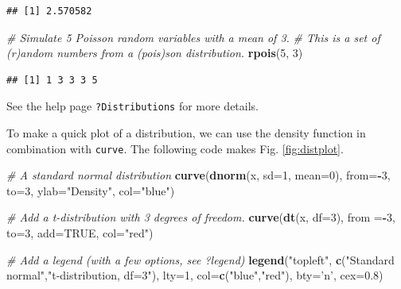 \documentclass[]{book}
\newenvironment{Shaded}{\begin{snugshade}}{\end{snugshade}}
\newcommand{\CommentTok}[1]{\textcolor[rgb]{0.56,0.35,0.01}{\textit{#1}}}
\newcommand{\DataTypeTok}[1]{\textcolor[rgb]{0.13,0.29,0.53}{#1}}
\newcommand{\DecValTok}[1]{\textcolor[rgb]{0.00,0.00,0.81}{#1}}
\newcommand{\FloatTok}[1]{\textcolor[rgb]{0.00,0.00,0.81}{#1}}
\newcommand{\KeywordTok}[1]{\textcolor[rgb]{0.13,0.29,0.53}{\textbf{#1}}}
\newcommand{\NormalTok}[1]{#1}
\newcommand{\OperatorTok}[1]{\textcolor[rgb]{0.81,0.36,0.00}{\textbf{#1}}}
\newcommand{\OtherTok}[1]{\textcolor[rgb]{0.56,0.35,0.01}{#1}}
\newcommand{\StringTok}[1]{\textcolor[rgb]{0.31,0.60,0.02}{#1}}
\begin{document}
\begin{Shaded}
\end{Shaded}

\begin{verbatim}
## [1] 2.570582
\end{verbatim}

\begin{Shaded}
\begin{Highlighting}[]
\CommentTok{# Simulate 5 Poisson random variables with a mean of 3. }
\CommentTok{# This is a set of (r)andom numbers from a (pois)son distribution.}
\KeywordTok{rpois}\NormalTok{(}\DecValTok{5}\NormalTok{, }\DecValTok{3}\NormalTok{)}
\end{Highlighting}
\end{Shaded}

\begin{verbatim}
## [1] 1 3 3 3 5
\end{verbatim}

See the help page \texttt{?Distributions} for more details.

To make a quick plot of a distribution, we can use the density function in combination with \texttt{curve}. The following code makes Fig. \ref{fig:distplot}.

\begin{Shaded}
\begin{Highlighting}[]
\CommentTok{# A standard normal distribution}
\KeywordTok{curve}\NormalTok{(}\KeywordTok{dnorm}\NormalTok{(x, }\DataTypeTok{sd=}\DecValTok{1}\NormalTok{, }\DataTypeTok{mean=}\DecValTok{0}\NormalTok{), }\DataTypeTok{from=}\OperatorTok{-}\DecValTok{3}\NormalTok{, }\DataTypeTok{to=}\DecValTok{3}\NormalTok{,}
      \DataTypeTok{ylab=}\StringTok{"Density"}\NormalTok{, }\DataTypeTok{col=}\StringTok{"blue"}\NormalTok{)}

\CommentTok{# Add a t-distribution with 3 degrees of freedom.}
\KeywordTok{curve}\NormalTok{(}\KeywordTok{dt}\NormalTok{(x, }\DataTypeTok{df=}\DecValTok{3}\NormalTok{), }\DataTypeTok{from =}\OperatorTok{-}\DecValTok{3}\NormalTok{, }\DataTypeTok{to=}\DecValTok{3}\NormalTok{, }\DataTypeTok{add=}\OtherTok{TRUE}\NormalTok{, }\DataTypeTok{col=}\StringTok{"red"}\NormalTok{)}

\CommentTok{# Add a legend (with a few options, see ?legend)}
\KeywordTok{legend}\NormalTok{(}\StringTok{"topleft"}\NormalTok{, }\KeywordTok{c}\NormalTok{(}\StringTok{"Standard normal"}\NormalTok{,}\StringTok{"t-distribution, df=3"}\NormalTok{), }\DataTypeTok{lty=}\DecValTok{1}\NormalTok{, }\DataTypeTok{col=}\KeywordTok{c}\NormalTok{(}\StringTok{"blue"}\NormalTok{,}\StringTok{"red"}\NormalTok{),}
       \DataTypeTok{bty=}\StringTok{'n'}\NormalTok{, }\DataTypeTok{cex=}\FloatTok{0.8}\NormalTok{)}
\end{Highlighting}
\end{Shaded}
\end{document}
